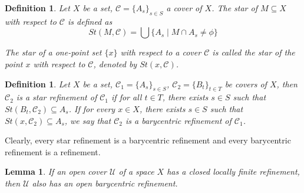 \documentclass[12pt,oneside,english]{amsbook}
\numberwithin{equation}{section} %
\numberwithin{figure}{section} %
\theoremstyle{plain}
\numberwithin{section}{chapter}
\theoremstyle{plain}
\newtheorem{lem}[thm]{Lemma}
\newtheorem{defn}[thm]{Definition}
\begin{document}
\begin{defn}
  Let $X$ be a set, $\mathcal{C} = \{A_{s}\}_{s \in S}$ a cover of $X$. The star of $M \subseteq X$ with respect to $\mathcal{C}$ is defined as
  $$St(M,\mathcal{C}) = \bigcup\{A_{s} \; | \; M \cap A_{s} \neq \phi \}$$

  The star of a one-point set $\{x\}$ with respect to a cover $\mathcal{C}$ is called the star of the point $x$ with respect to $\mathcal{C}$, denoted by $St(x,\mathcal{C})$.
\end{defn}

\begin{defn}
  Let $X$ be a set, $\mathcal{C}_1 = \{A_{s}\}_{s \in S}$, $\mathcal{C}_2 = \{B_{t}\}_{t \in T}$ be covers of $X$, then $\mathcal{C}_2$ is a star refinement of $\mathcal{C}_1$ if for all $t \in T$, there exists $s \in S$ such that $St(B_{t},\mathcal{C}_2) \subseteq A_{s}$. If for every $x \in X$, there exists $s \in S$ such that $St(x,\mathcal{C}_2) \subseteq A_{s}$, we say that $\mathcal{C}_2$ is a barycentric refinement of $\mathcal{C}_1$.
\end{defn}

Clearly, every star refinement is a barycentric refinement and every barycentric refinement is a refinement.

\begin{lem} \label{lem:paracompact:10}
  If an open cover $\mathcal{U}$ of a space $X$ has a closed locally finite refinement, then $\mathcal{U}$ also has an open barycentric refinement. 
\end{lem}
\end{document}
